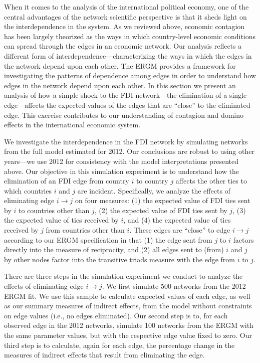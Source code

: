 \documentclass[reqno,onecolumn,letterpaper,12pt]{article}
\begin{document}
When it comes to the analysis of the international political economy, one of the central advantages of the network scientific perspective is that it sheds light on the interdependence in the system. As we reviewed above, economic contagion has been largely theorized as the ways in which country-level economic conditions can spread through the edges in an economic network. Our analysis reflects a different form of interdependence---characterizing the ways in which the edges in the network depend upon each other. The ERGM provides a framework for investigating the patterns of dependence among edges in order to understand how edges in the network depend upon each other. In this section we present an analysis of how a simple shock to the FDI network---the elimination of a single edge---affects the expected values of the edges that are ``close'' to the eliminated edge. This exercise contributes to our understanding of contagion and domino effects in the international economic system.

We investigate the interdependence in the FDI network by simulating networks from the full model estimated for 2012. Our conclusions are robust to using other years---we use 2012 for consistency with the model interpretations presented above. Our objective in this simulation experiment is to understand how the elimination of an FDI edge from country $i$ to country $j$ affects the other ties to which countries $i$ and $j$ are incident. Specifically, we analyze the effects of eliminating edge $i \rightarrow j$  on four measures: (1) the expected value of FDI ties sent by $i$ to countries other than $j$, (2) the expected value of FDI ties sent by $j$, (3) the expected value of ties received by $i$, and (4) the expected value of ties received by $j$ from countries other than $i$.  These edges are ``close'' to edge $i \rightarrow j$ according to our ERGM specification in that (1) the edge sent from $j$ to $i$ factors directly into the measure of reciprocity, and (2) all edges sent to (from) $i$ and $j$ by other nodes factor into the transitive triads measure with the edge from $i$ to $j$.

There are three steps in the simulation experiment we conduct to analyze the effects of eliminating edge $i \rightarrow j$. We first simulate 500 networks from the 2012 ERGM fit. We use this sample to calculate expected values of each edge, as well as our summary measures of indirect effects, from the model without constraints on edge values (i.e., no edges eliminated). Our second step is to, for each observed edge in the 2012 networks, simulate 100 networks from the ERGM with the same parameter values, but with the respective edge value fixed to zero. Our third step is to calculate, again for each edge, the percentage change in the measures of indirect effects that result from eliminating the edge.
\end{document}
